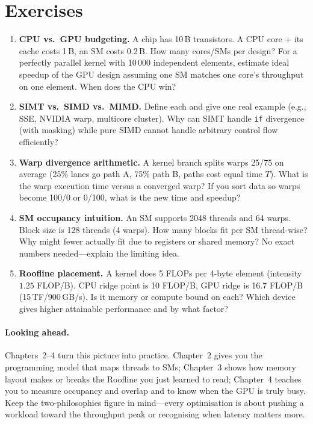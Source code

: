 \section{Exercises}
\label{sec:ch01-exercises}
\begin{enumerate}[label=E1.\arabic*, leftmargin=*, itemsep=0.6em]
    \item \textbf{CPU vs.\ GPU budgeting.} A chip has 10\,B transistors. A CPU core + its cache costs 1\,B, an SM costs 0.2\,B. How many cores/SMs per design? For a perfectly parallel kernel with 10\,000 independent elements, estimate ideal speedup of the GPU design assuming one SM matches one core's throughput on one element. When does the CPU win?
    \item \textbf{SIMT vs.\ SIMD vs.\ MIMD.} Define each and give one real example (e.g., SSE, NVIDIA warp, multicore cluster). Why can SIMT handle \texttt{if} divergence (with masking) while pure SIMD cannot handle arbitrary control flow efficiently?
    \item \textbf{Warp divergence arithmetic.} A kernel branch splits warps 25/75 on average (25\% lanes go path A, 75\% path B, paths cost equal time $T$). What is the warp execution time versus a converged warp? If you sort data so warps become 100/0 or 0/100, what is the new time and speedup?
    \item \textbf{SM occupancy intuition.} An SM supports 2048 threads and 64 warps. Block size is 128 threads (4 warps). How many blocks fit per SM thread-wise? Why might fewer actually fit due to registers or shared memory? No exact numbers needed---explain the limiting idea.
    \item \textbf{Roofline placement.} A kernel does 5 FLOPs per 4-byte element (intensity $1.25$ FLOP/B). CPU ridge point is 10 FLOP/B, GPU ridge is 16.7 FLOP/B (15\,TF/900\,GB/s). Is it memory or compute bound on each? Which device gives higher attainable performance and by what factor?
\end{enumerate}

\paragraph{Looking ahead.} Chapters~2--4 turn this picture into practice. Chapter~2 gives you the programming model that maps threads to SMs; Chapter~3 shows how memory layout makes or breaks the Roofline you just learned to read; Chapter~4 teaches you to measure occupancy and overlap and to know when the GPU is truly busy. Keep the two-philosophies figure in mind---every optimisation is about pushing a workload toward the throughput peak or recognising when latency matters more.


